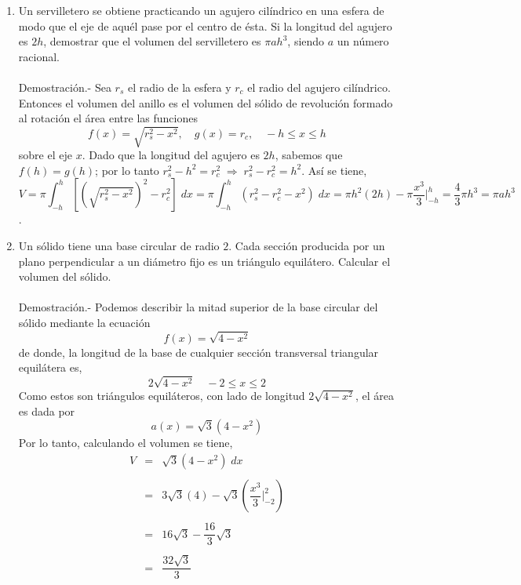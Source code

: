 \begin{enumerate}[ \bfseries 1.]
    \item Un servilletero se obtiene practicando un agujero cilíndrico en una esfera de modo que el eje de aquél pase por el centro de ésta. Si la longitud del agujero es $2h$, demostrar que el volumen del servilletero es $\pi ah^3$, siendo $a$ un número racional.\\\\
	Demostración.-\; Sea $r_s$ el radio de la esfera y $r_c$ el radio del agujero cilíndrico. Entonces el volumen del anillo es el volumen del sólido de revolución formado al rotación el área entre las funciones 
	$$f(x) = \sqrt{r_s^2 - x^2}, \quad g(x)=r_c,\quad -h\leq x\leq h$$
	sobre el eje $x$. Dado que la longitud del agujero es $2h$, sabemos que $f(h)=g(h)$; por lo tanto $r_s^2 - h^2 = r_c^2 \; \Longrightarrow \; r_s^2 - r_c^2 = h^2.$ Así se tiene,
	$$V = \pi\int_{-h}^h \left[\left(\sqrt{r_s^2 - x^2}\right)^2 - r_c^2\right]\; dx = \pi \int_{-h}^h (r_s^2 - r_c^2 -x^2)\; dx = \pi h^2 (2h) - \pi \dfrac{x^3}{3}\bigg|_{-h}^h = \dfrac{4}{3}\pi h^3 = \pi a h^3$$.\\

    \item Un sólido tiene una base circular de radio $2$. Cada sección producida por un plano perpendicular a un diámetro fijo es un triángulo equilátero. Calcular el volumen del sólido.\\\\
	Demostración.-\; Podemos describir la mitad superior de la base circular del sólido mediante la ecuación
	$$f(x)=\sqrt{4-x^2}$$
	de donde, la longitud de la base de cualquier sección transversal triangular equilátera es,
	$$2\sqrt{4-x^2}\quad -2\leq x \leq 2$$
	Como estos son triángulos equiláteros, con lado de longitud $2\sqrt{4-x^2}$, el área es dada por 
	$$a(x) = \sqrt{3}(4-x^2)$$
	Por lo tanto, calculando el volumen se tiene,
	$$\begin{array}{rcl}
	    V&=&\sqrt{3}(4-x^2)\; dx\\\\
	     &=&3\sqrt{3}(4) - \sqrt{3}\left(\dfrac{x^3}{3}\bigg|_{-2}^2\right)\\\\
	     &=&16\sqrt{3} - \dfrac{16}{3}\sqrt{3}\\\\
	     &=&\dfrac{32\sqrt{3}}{3}\\\\
	\end{array}$$
	\vspace{0.5cm}


\end{enumerate}
